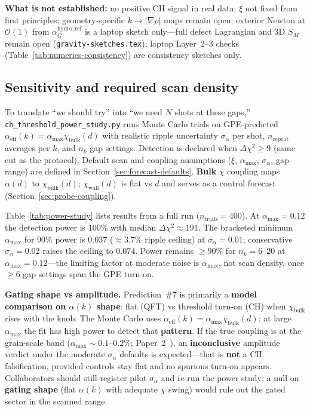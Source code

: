 \documentclass[11pt,a4paper]{article}
\begin{document}
\textbf{What is not established:} no positive CH signal in real data; $\xi$ not fixed from first principles; geometry-specific $k \to |\nabla\rho|$ maps remain open; exterior Newton at $\mathcal{O}(1)$ from $\alpha_G^{\mathrm{hydro,ref}}$ is a laptop sketch only---full defect Lagrangian and 3D $S_M$ remain open (\texttt{gravity-sketches.tex}); laptop Layer~2--3 checks (Table~\ref{tab:numerics-consistency}) are consistency sketches only.

\subsection{Sensitivity and required scan density}
\label{sec:power-study}

To translate ``we should try'' into ``we need $N$ shots at these gaps,'' \texttt{ch\_threshold\_power\_study.py} runs Monte Carlo trials on GPE-predicted $\alpha_{\mathrm{eff}}(k) = \alpha_{\max}\chi_{\mathrm{bulk}}(d)$ with realistic ripple uncertainty $\sigma_\alpha$ per shot, $n_{\mathrm{repeat}}$ averages per $k$, and $n_k$ gap settings.
Detection is declared when $\Delta\chi^2 \geq 9$ (same cut as the protocol).
Default scan and coupling assumptions ($\xi$, $\alpha_{\max}$, $\sigma_\alpha$, gap range) are defined in Section~\ref{sec:forecast-defaults}.
\textbf{Bulk} $\chi$ coupling maps $\alpha(d)$ to $\chi_{\mathrm{bulk}}(d)$; $\chi_{\mathrm{wall}}(d)$ is flat vs $d$ and serves as a control forecast (Section~\ref{sec:probe-coupling}).

Table~\ref{tab:power-study} lists results from a full run ($n_{\mathrm{trials}} = 400$).
At $\alpha_{\max} = 0.12$ the detection power is $100\%$ with median $\Delta\chi^2 \approx 191$.
The bracketed minimum $\alpha_{\max}$ for 90\% power is $0.037$ ($\approx 3.7\%$ ripple ceiling) at $\sigma_\alpha = 0.01$; conservative $\sigma_\alpha = 0.02$ raises the ceiling to $0.074$.
Power remains $\geq 90\%$ for $n_k = 6$--$20$ at $\alpha_{\max} = 0.12$---the limiting factor at moderate noise is $\alpha_{\max}$, not scan density, once $\geq 6$ gap settings span the GPE turn-on.

\textbf{Gating shape vs amplitude.}
Prediction~\#7 is primarily a \textbf{model comparison on $\alpha(k)$ shape}: flat (QFT) vs threshold turn-on (CH) when $\chi_{\mathrm{bulk}}$ rises with the knob.
The Monte Carlo uses $\alpha_{\mathrm{eff}}(k) = \alpha_{\max}\chi_{\mathrm{bulk}}(d)$; at large $\alpha_{\max}$ the fit has high power to detect that \textbf{pattern}.
If the true coupling is at the grain-scale band ($\alpha_{\max} \sim 0.1$--$0.2\%$; Paper~2~\cite{CHPaper2}), an \textbf{inconclusive} amplitude verdict under the moderate $\sigma_\alpha$ defaults is expected---that is \textbf{not} a CH falsification, provided controls stay flat and no spurious turn-on appears.
Collaborators should still register pilot $\sigma_\alpha$ and re-run the power study; a null on \textbf{gating shape} (flat $\alpha(k)$ with adequate $\chi$ swing) would rule out the gated sector in the scanned range.
\end{document}
